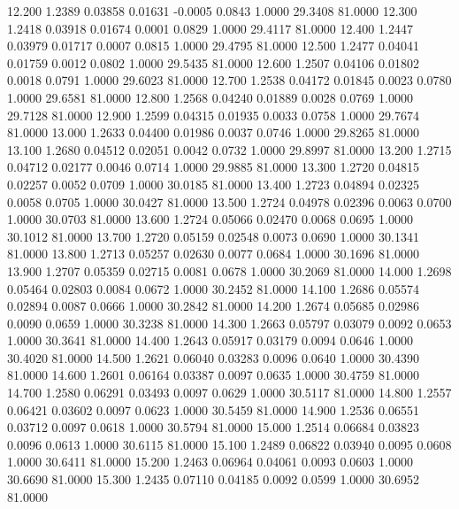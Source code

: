   12.200   1.2389   0.03858   0.01631  -0.0005   0.0843   1.0000  29.3408  81.0000
  12.300   1.2418   0.03918   0.01674   0.0001   0.0829   1.0000  29.4117  81.0000
  12.400   1.2447   0.03979   0.01717   0.0007   0.0815   1.0000  29.4795  81.0000
  12.500   1.2477   0.04041   0.01759   0.0012   0.0802   1.0000  29.5435  81.0000
  12.600   1.2507   0.04106   0.01802   0.0018   0.0791   1.0000  29.6023  81.0000
  12.700   1.2538   0.04172   0.01845   0.0023   0.0780   1.0000  29.6581  81.0000
  12.800   1.2568   0.04240   0.01889   0.0028   0.0769   1.0000  29.7128  81.0000
  12.900   1.2599   0.04315   0.01935   0.0033   0.0758   1.0000  29.7674  81.0000
  13.000   1.2633   0.04400   0.01986   0.0037   0.0746   1.0000  29.8265  81.0000
  13.100   1.2680   0.04512   0.02051   0.0042   0.0732   1.0000  29.8997  81.0000
  13.200   1.2715   0.04712   0.02177   0.0046   0.0714   1.0000  29.9885  81.0000
  13.300   1.2720   0.04815   0.02257   0.0052   0.0709   1.0000  30.0185  81.0000
  13.400   1.2723   0.04894   0.02325   0.0058   0.0705   1.0000  30.0427  81.0000
  13.500   1.2724   0.04978   0.02396   0.0063   0.0700   1.0000  30.0703  81.0000
  13.600   1.2724   0.05066   0.02470   0.0068   0.0695   1.0000  30.1012  81.0000
  13.700   1.2720   0.05159   0.02548   0.0073   0.0690   1.0000  30.1341  81.0000
  13.800   1.2713   0.05257   0.02630   0.0077   0.0684   1.0000  30.1696  81.0000
  13.900   1.2707   0.05359   0.02715   0.0081   0.0678   1.0000  30.2069  81.0000
  14.000   1.2698   0.05464   0.02803   0.0084   0.0672   1.0000  30.2452  81.0000
  14.100   1.2686   0.05574   0.02894   0.0087   0.0666   1.0000  30.2842  81.0000
  14.200   1.2674   0.05685   0.02986   0.0090   0.0659   1.0000  30.3238  81.0000
  14.300   1.2663   0.05797   0.03079   0.0092   0.0653   1.0000  30.3641  81.0000
  14.400   1.2643   0.05917   0.03179   0.0094   0.0646   1.0000  30.4020  81.0000
  14.500   1.2621   0.06040   0.03283   0.0096   0.0640   1.0000  30.4390  81.0000
  14.600   1.2601   0.06164   0.03387   0.0097   0.0635   1.0000  30.4759  81.0000
  14.700   1.2580   0.06291   0.03493   0.0097   0.0629   1.0000  30.5117  81.0000
  14.800   1.2557   0.06421   0.03602   0.0097   0.0623   1.0000  30.5459  81.0000
  14.900   1.2536   0.06551   0.03712   0.0097   0.0618   1.0000  30.5794  81.0000
  15.000   1.2514   0.06684   0.03823   0.0096   0.0613   1.0000  30.6115  81.0000
  15.100   1.2489   0.06822   0.03940   0.0095   0.0608   1.0000  30.6411  81.0000
  15.200   1.2463   0.06964   0.04061   0.0093   0.0603   1.0000  30.6690  81.0000
  15.300   1.2435   0.07110   0.04185   0.0092   0.0599   1.0000  30.6952  81.0000
